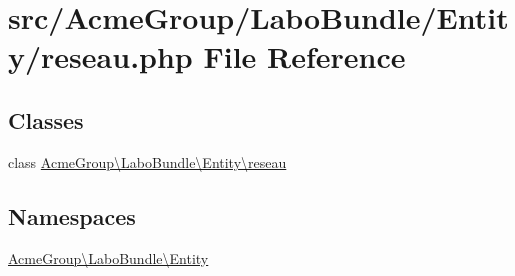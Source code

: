 \hypertarget{reseau_8php}{\section{src/\+Acme\+Group/\+Labo\+Bundle/\+Entity/reseau.php File Reference}
\label{reseau_8php}
}
\subsection*{Classes}
\begin{DoxyCompactItemize}
\item 
class \hyperlink{class_acme_group_1_1_labo_bundle_1_1_entity_1_1reseau}{Acme\+Group\textbackslash{}\+Labo\+Bundle\textbackslash{}\+Entity\textbackslash{}reseau}
\end{DoxyCompactItemize}
\subsection*{Namespaces}
\begin{DoxyCompactItemize}
\item 
 \hyperlink{namespace_acme_group_1_1_labo_bundle_1_1_entity}{Acme\+Group\textbackslash{}\+Labo\+Bundle\textbackslash{}\+Entity}
\end{DoxyCompactItemize}
